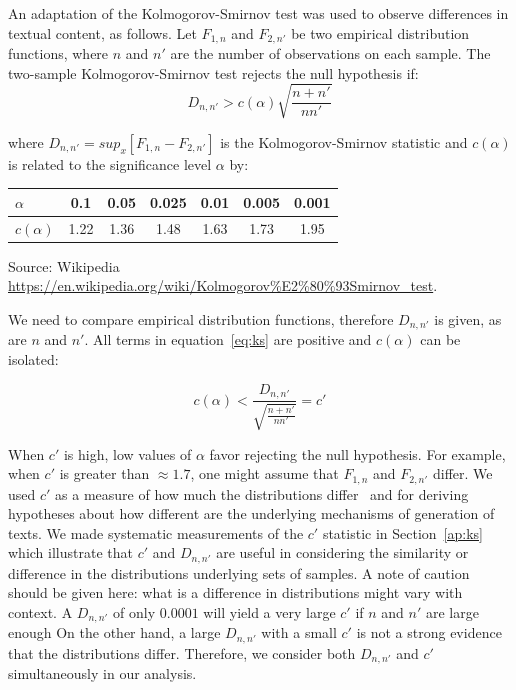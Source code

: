 An adaptation of the Kolmogorov-Smirnov test was used to observe differences in textual content, as follows.
Let $F_{1,n}$ and $F_{2,n'}$ be two empirical distribution functions, where $n$ and $n'$ are the number of observations on each sample.
The two-sample Kolmogorov-Smirnov test rejects the null hypothesis if:
\begin{equation}\label{eq:ks}
D_{n,n'} > c(\alpha)\sqrt{\frac{n+n'}{nn'}}
\end{equation}

\noindent where $D_{n,n'}=sup_x[F_{1,n}-F_{2,n'}]$ is the Kolmogorov-Smirnov statistic
and $c(\alpha)$ is related to the significance level $\alpha$ by:

\begin{table}[H]
\centering
\begin{tabular}{|l||c|c|c|c|c|c|}\hline
$\alpha$    & 0.1  & 0.05 & 0.025 & 0.01 & 0.005 & 0.001 \\\hline
$c(\alpha)$ & 1.22 & 1.36 & 1.48  & 1.63 & 1.73  & 1.95  \\\hline
\end{tabular}
\begin{flushleft}
	Source: Wikipedia \url{https://en.wikipedia.org/wiki/Kolmogorov%E2%80%93Smirnov_test}.\
\end{flushleft}
\end{table}

We need to compare empirical distribution functions,
therefore $D_{n,n'}$ is given, as are $n$ and $n'$.
All terms in equation~\ref{eq:ks} are positive and $c(\alpha)$ can be isolated:

\begin{equation}\label{eq:ks2}
c(\alpha) < \frac{D_{n,n'}}{\sqrt{\frac{n+n'}{nn'}}} = c'
\end{equation}

When $c'$ is high, low values of $\alpha$ favor rejecting the null hypothesis.
For example, when $c'$ is greater than $\approx 1.7$, one might assume that $F_{1,n}$ and $F_{2,n'}$ differ.
We used $c'$ as a measure of how much
the distributions differ~\cite{kolm}
and for deriving hypotheses
about how different are the underlying mechanisms of generation of texts.
We made systematic measurements of the $c'$ statistic in Section~\ref{ap:ks}
which illustrate that $c'$ and $D_{n,n'}$ are useful in considering the
similarity or difference in the distributions underlying sets of samples.
A note of caution should be given here: what is a difference in distributions
might vary with context.
A $D_{n,n'}$ of only $0.0001$ will yield a very large $c'$ if $n$ and $n'$ are large enough
On the other hand, a large $D_{n,n'}$ with a small $c'$ is not a strong evidence that
the distributions differ.
Therefore, we consider both $D_{n,n'}$ and $c'$ simultaneously in our analysis.

